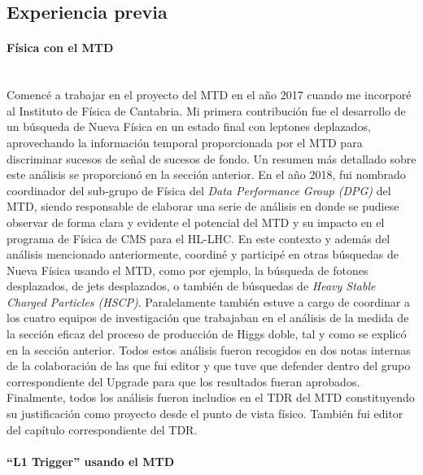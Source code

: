 \subsection{Experiencia previa}

\paragraph{Física con el MTD\\\\}\label{MTDFisica}

Comencé a trabajar en el proyecto del MTD en el año 2017 cuando me incorporé al Instituto de Física de Cantabria. Mi primera contribución fue el desarrollo de un búsqueda de Nueva Física en un estado final con leptones deplazados, aprovechando la información temporal proporcionada por el MTD para discriminar sucesos de señal de sucesos de fondo. Un resumen más detallado sobre este análisis se proporcionó en la sección anterior. En el año 2018, fui nombrado coordinador del sub-grupo de Física del \emph{Data Performance Group (DPG)} del MTD, siendo responsable de elaborar una serie de análisis en donde se pudiese observar de forma clara y evidente el potencial del MTD y su impacto en el programa de Física de CMS para el HL-LHC. En este contexto y además del análisis mencionado anteriormente, coordiné y participé en otras búsquedas de Nueva Física usando el MTD, como por ejemplo, la búsqueda de fotones desplazados, de jets desplazados, o también de búsquedas de \emph{Heavy Stable Charged Particles (HSCP)}. Paralelamente también estuve a cargo de coordinar a los cuatro equipos de investigación que trabajaban en el análisis de la medida de la sección eficaz del proceso de producción de Higgs doble, tal y como se explicó en la sección anterior. Todos estos análisis fueron recogidos en dos notas internas de la colaboración de las que fui editor y que tuve que defender dentro del grupo correspondiente del Upgrade para que los resultados fueran aprobados. Finalmente, todos los análisis fueron includios en el TDR del MTD constituyendo su justificación como proyecto desde el punto de vista físico. También fui editor del capítulo correspondiente del TDR.

\paragraph{``L1 Trigger'' usando el MTD\\\\}

